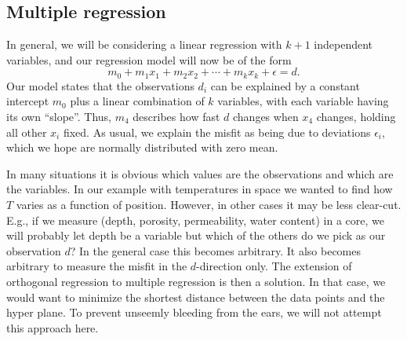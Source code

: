 \subsection{Multiple regression}
\label{sec:mregexample}
In general, we will be considering a linear regression 
with $k+1$ independent variables, and our regression model will now be of the form
\begin{equation}
m_0 + m_1 x_1 +  m_2 x_2 + \cdots + m_k x_k + \epsilon = d.
 \end{equation}	 	
Our model states that the observations $d_i$ can be explained by a constant intercept $m_0$ plus a linear 
combination of $k$ variables, with each variable having its own ``slope''.  Thus, $m_4$ describes how 
fast $d$ changes when $x_4$ changes, holding all other $x_i$ fixed.  As usual, we explain the misfit as 
being due to deviations $\epsilon_i$, which we hope are normally distributed with zero mean.
	
In many situations it is obvious which values are the observations and which are the 
variables.  In our example with temperatures in space we wanted to  find how $T$ varies as a 
function of position.  However, in other cases it may be less clear-cut.  E.g., if we measure (depth, 
porosity, permeability, water content) in a core, we will probably let depth be a variable but which 
of the others do we pick as our observation $d$?  In the general case this becomes arbitrary.  It also becomes 
arbitrary to measure the misfit in the $d$-direction only.  The extension of orthogonal regression to 
multiple regression is then a solution. In that case, we would want to minimize the shortest distance 
between the data points and the hyper plane.  To prevent unseemly bleeding from the ears, we will not attempt this approach here.
	
